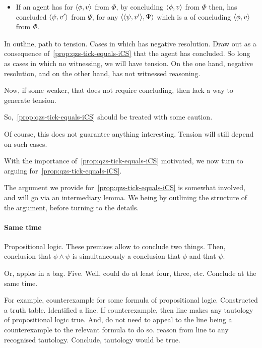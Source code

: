 \begin{note}[Contraposition]
  \begin{itemize}
  \item
    If an agent has \zetaS{} for \(\langle \phi, v \rangle\) from \(\Phi\), by concluding \(\langle \phi, v \rangle\) from \(\Phi\) then, has concluded \(\langle \psi, v' \rangle\) from \(\Psi\), for any \(\langle \langle \psi, v' \rangle, \Psi \rangle\) which is a \requ{} of concluding \(\langle \phi, v \rangle\) from \(\Phi\).
  \end{itemize}

  In outline, path to tension.
  Cases in which \qzS{} has negative resolution.
  Draw out as a consequence of~\autoref{prop:qzs-tick-equals-iCS} that the agent has concluded.
  So long as cases in which no witnessing, we will have tension.
  On the one hand, negative resolution, and on the other hand, has not witnessed reasoning.

  Now, if some weaker, that does not require concluding, then lack a way to generate tension.

  So,~\autoref{prop:qzs-tick-equals-iCS} should be treated with some caution.

  Of course, this does not guarantee anything interesting.
  Tension will still depend on such cases.
\end{note}

\begin{note}
  With the importance of~\autoref{prop:qzs-tick-equals-iCS} motivated, we now turn to arguing for~\autoref{prop:qzs-tick-equals-iCS}.

  The argument we provide for~\autoref{prop:qzs-tick-equals-iCS} is somewhat involved, and will go via an intermediary lemma.
  We being by outlining the structure of the argument, before turning to the details.
\end{note}

\paragraph*{Same time}

\begin{note}
  Propositional logic.
  These premises allow to conclude two things.
  Then, conclusion that \(\phi \land \psi\) is simultaneously a conclusion that \(\phi\) and that \(\psi\).

  Or, apples in a bag.
  Five.
  Well, could do at least four, three, etc.
  Conclude at the same time.
\end{note}

\begin{note}
  For example, counterexample for some formula of propositional logic.
  Constructed a truth table.
  Identified a line.
  If counterexample, then line makes any tautology of propositional logic true.
  And, do not need to appeal to the line being a counterexample to the relevant formula to do so.
  reason from line to any recognised tautology.
  Conclude, tautology would be true.
\end{note}

